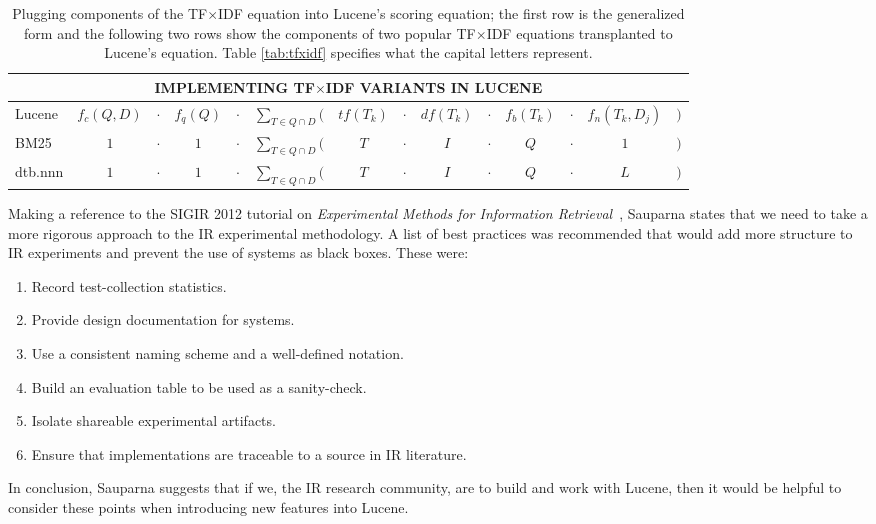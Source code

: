 \begin{table}[bht!]
  \centering
  \small
  \begin{minipage}[t]{0.94\textwidth}

    \begin{tabular}{lccccccccccccc}
      \multicolumn{14}{c}{IMPLEMENTING TF$\times$IDF VARIANTS IN LUCENE}
      \\
      \hline\hline

      Lucene    & $f_{c}(Q,D)$ & $\cdot$  & $f_{q}(Q)$
      & $\cdot$ & $\displaystyle\sum_{T \in Q \cap D}($  & $tf(T_{k})$
      & $\cdot$ & $df(T_{k})$  & $\cdot$  & $f_{b}(T_{k})$
      & $\cdot$ & $f_{n}(T_{k}, D_{j})$   & $)$ \\
      
      BM25      & $1$          &  $\cdot$ & $1$
      & $\cdot$ & $\displaystyle\sum_{T \in Q \cap D}($  & $T$
      & $\cdot$ & $I$          & $\cdot$  & $Q$
      & $\cdot$ & $1$          & $)$ \\

      dtb.nnn   & $1$          & $\cdot$  & $1$
      & $\cdot$ & $\displaystyle\sum_{T \in Q \cap D}($  & $T$
      & $\cdot$ & $I$          & $\cdot$  & $Q$
      & $\cdot$ & $L$          & $)$ \\

      \hline\hline
    \end{tabular}

    \caption{\small Plugging components of the TF$\times$IDF equation into
      Lucene's scoring equation; the first row is the generalized form
      and the following two rows show the components of two popular
      TF$\times$IDF equations transplanted to Lucene's equation. Table
      \ref{tab:tfxidf} specifies what the capital letters represent.}

    \label{tab:lucene}

  \end{minipage}
\end{table}

Making a reference to the SIGIR 2012 tutorial on \emph{Experimental
  Methods for Information
  Retrieval}~\cite{Metzler:2012:EMI:2348283.2348534}, Sauparna states
that we need to take a more rigorous approach to the IR experimental
methodology. A list of best practices was recommended that would add
more structure to IR experiments and prevent the use of systems as
black boxes. These were:

\begin{enumerate}
\item Record test-collection statistics.
\item Provide design documentation for systems.
\item Use a consistent naming scheme and a well-defined notation.
\item Build an evaluation table to be used as a sanity-check.
\item Isolate shareable experimental artifacts.
\item Ensure that implementations are traceable to a source in IR
  literature.
\end{enumerate}

In conclusion, Sauparna suggests that if we, the IR research
community, are to build and work with Lucene, then it would be helpful
to consider these points when introducing new features into Lucene.


